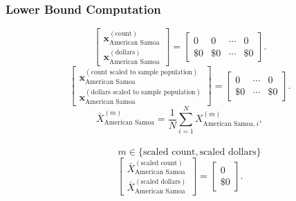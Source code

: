 \subsubsection{Lower Bound Computation}
\[
\begin{bmatrix}
\mathbf{x}_{\text{American Samoa}}^{(\text{count})}\\
\mathbf{x}_{\text{American Samoa}}^{(\text{dollars})}
\end{bmatrix}
=
\begin{bmatrix}
0 & 0 & \cdots & 0\\
\$0 &\$0 & \cdots &\$0 
\end{bmatrix}.
\]
\[
\begin{bmatrix}
\mathbf{x}_{\text{American Samoa}}^{(\text{count scaled to sample population})}\\
\mathbf{x}_{\text{American Samoa}}^{(\text{dollars scaled to sample population})}
\end{bmatrix}
=
\begin{bmatrix}
0 & \cdots & 0\\
\$0 & \cdots &\$0
\end{bmatrix}.
\]
  \[
\bar{X}_{\text{American Samoa}}^{(m)}
= \frac{1}{N}\sum_{i=1}^{N} X_{\text{American Samoa},i}^{(m)},
\]
\\
\[
\qquad
m \in \{\text{scaled count},\text{scaled dollars}\}
\]
\[
\begin{bmatrix}
\bar{X}_{\text{American Samoa}}^{(\text{scaled count})}\\
\bar{X}_{\text{American Samoa}}^{(\text{scaled dollars})}
\end{bmatrix}
=
\begin{bmatrix}
0\\
\$0
\end{bmatrix}.
\]
